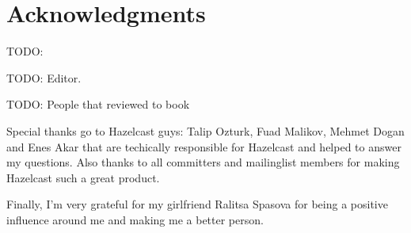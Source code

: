 \chapter*{Acknowledgments}

TODO: 

TODO: Editor.

TODO: People that reviewed to book

Special thanks go to Hazelcast guys: Talip Ozturk, Fuad Malikov, Mehmet Dogan
and Enes Akar that are techically responsible for Hazelcast and helped to 
answer my questions. Also thanks to all committers and mailinglist members
for making Hazelcast such a great product.

Finally, I'm very grateful for my girlfriend Ralitsa Spasova for being a positive
influence around me and making me a better person.

